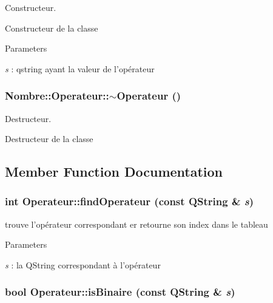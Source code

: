 Constructeur. 

Constructeur de la classe


\begin{DoxyParams}{Parameters}
\item[{\em s}]: qstring ayant la valeur de l'opérateur \end{DoxyParams}
\hypertarget{classNombre_1_1Operateur_a65f4226509f0cf55a129a08693b7dfcd}{
\subsubsection[{$\sim$Operateur}]{\setlength{\rightskip}{0pt plus 5cm}Nombre::Operateur::$\sim$Operateur ()}}
\label{classNombre_1_1Operateur_a65f4226509f0cf55a129a08693b7dfcd}


Destructeur. 

Destructeur de la classe 

\subsection{Member Function Documentation}
\hypertarget{classNombre_1_1Operateur_aedeab5364cf6164cc18e7e555ffceb9a}{
\subsubsection[{findOperateur}]{\setlength{\rightskip}{0pt plus 5cm}int Operateur::findOperateur (const QString \& {\em s})}}
\label{classNombre_1_1Operateur_aedeab5364cf6164cc18e7e555ffceb9a}


trouve l'opérateur correspondant er retourne son index dans le tableau 


\begin{DoxyParams}{Parameters}
\item[{\em s}]: la QString correspondant à l'opérateur \end{DoxyParams}
\hypertarget{classNombre_1_1Operateur_a5fb21bb459b4197a7ea462d212af5809}{
\subsubsection[{isBinaire}]{\setlength{\rightskip}{0pt plus 5cm}bool Operateur::isBinaire (const QString \& {\em s})}}
\label{classNombre_1_1Operateur_a5fb21bb459b4197a7ea462d212af5809}


